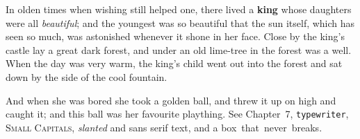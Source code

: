 In olden times when wishing still helped one, there lived a \textbf{king} whose daughters
were all \emph{beautiful}; and the youngest was so beautiful that the sun itself, which has
seen so much, was astonished whenever it shone in her face. Close by the king's castle lay a
great dark forest, and under an old lime-tree in the forest was a well.\\
When the day was very warm, the king's child went out into the forest and sat down by the
side of the cool fountain.

{\small And when she was bored she took a golden ball, and threw it up on high and caught it;
and this ball was her favourite plaything.} See Chapter~7, \texttt{typewriter}, \textsc{Small
Capitals}, \textsl{slanted} and \textsf{sans serif} text, and a \mbox{box that never breaks}.
